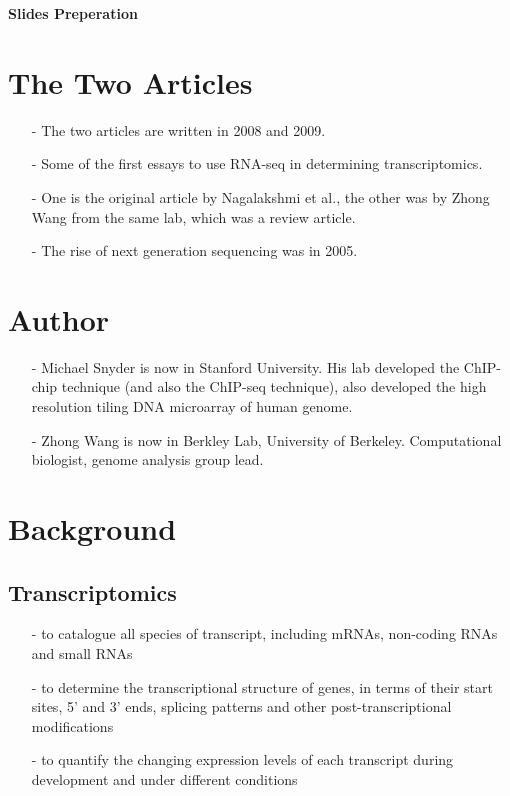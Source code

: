 \documentclass[12pt]{article}
\begin{document}
	\center \huge{{\textbf{Slides Preperation}}
	\normalsize {}
	
	\raggedright

	\section{The Two Articles}
	\begin{itemize}
		\item [-]The two articles are written in 2008 and 2009. 
		\item [-]Some of the first essays to use RNA-seq in determining transcriptomics.
		\item [-]One is the original article by Nagalakshmi et al., the other was by Zhong Wang from the same lab, which was a review article.
		\item [-]The rise of next generation sequencing was in 2005.
	\end{itemize}	
	
	\section{Author}
	\begin{itemize}
		\item [-]Michael Snyder is now in Stanford University. His lab developed the ChIP-chip technique (and also the ChIP-seq technique), also developed the high resolution tiling DNA microarray of human genome.
		\item [-]Zhong Wang is now in Berkley Lab, University of Berkeley. Computational biologist, genome analysis group lead.
	\end{itemize}
	
	\section{Background}
	\subsection{Transcriptomics}
	\begin{itemize}
		\item[-] to catalogue all species of transcript, including mRNAs, non-coding RNAs and small RNAs
		\item[-] to determine the transcriptional structure of genes, in terms of their start sites, 5' and 3' ends, splicing patterns and other post-transcriptional modifications
		\item[-] to quantify the changing expression levels of each transcript during development and under different conditions
	\end{itemize}
	
}
\end{document}
